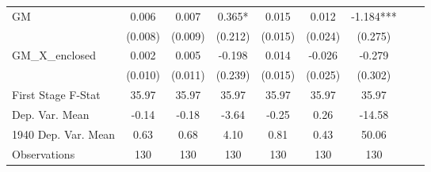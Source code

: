 \begin{tabular}{l*{8}{c}}
GM              &    0.006   &    0.007   &    0.365*  &    0.015   &    0.012   &   -1.184***\\
                &  (0.008)   &  (0.009)   &  (0.212)   &  (0.015)   &  (0.024)   &  (0.275)   \\
\addlinespace
GM\_X\_enclosed   &    0.002   &    0.005   &   -0.198   &    0.014   &   -0.026   &   -0.279   \\
                &  (0.010)   &  (0.011)   &  (0.239)   &  (0.015)   &  (0.025)   &  (0.302)   \\
\midrule
First Stage F-Stat&    35.97   &    35.97   &    35.97   &    35.97   &    35.97   &    35.97   \\
Dep. Var. Mean  &    -0.14   &    -0.18   &    -3.64   &    -0.25   &     0.26   &   -14.58   \\
1940 Dep. Var. Mean&     0.63   &     0.68   &     4.10   &     0.81   &     0.43   &    50.06   \\
Observations    &      130   &      130   &      130   &      130   &      130   &      130   \\
       \bottomrule \end{tabular}
